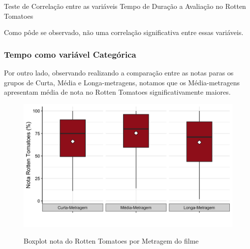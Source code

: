 \documentclass[a4paper, 12pt]{article} %
\begin{document}
\begin{quadro}[H]
\centering
\caption{Teste de Correlação entre as variáveis Tempo de Duração a Avaliação no Rotten Tomatoes }
\label{R-Q-Teste-1}
\vspace{0.1cm}
\end{quadro}

Como pôde se observado, não uma correlação significativa entre essas variáveis. 

\subsubsection{ Tempo como variável Categórica}

Por outro lado, observando realizando a comparação entre as notas paras os grupos de Curta, Média e Longa-metragens, notamos que os Média-metragens apresentam média de nota no Rotten Tomatoes significativamente maiores.

\begin{figure}[H]
    \centering
    \caption{Boxplot nota do Rotten Tomatoes por Metragem do filme}
    \includegraphics[scale=0.25]{Fig_Rottem_Metragem.png}
    \label{fig:my_label}
\end{figure}
\end{document}
